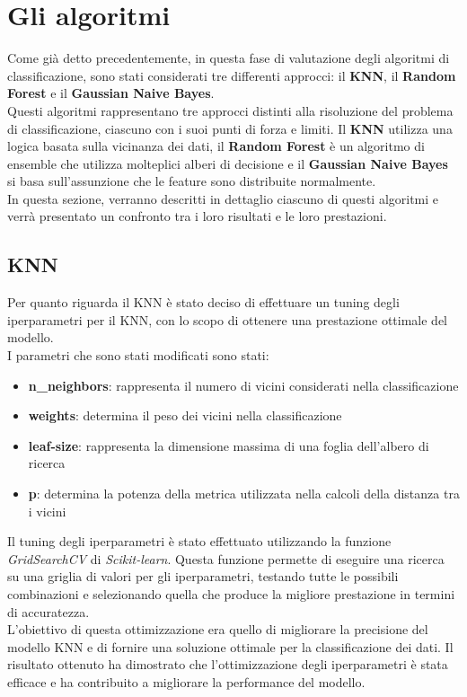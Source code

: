 \documentclass[../../Report.tex]{subfiles}
\begin{document}
\section{Gli algoritmi}
Come già detto precedentemente, in questa fase di valutazione degli algoritmi di classificazione, sono stati considerati tre differenti approcci: il \textbf{KNN}, il \textbf{Random Forest} e il \textbf{Gaussian Naive Bayes}.\\
Questi algoritmi rappresentano tre approcci distinti alla risoluzione del problema di classificazione, ciascuno con i suoi punti di forza e limiti. Il \textbf{KNN} utilizza una logica basata sulla vicinanza dei dati, il \textbf{Random Forest} è un algoritmo di ensemble che utilizza molteplici alberi di decisione e il \textbf{Gaussian Naive Bayes} si basa sull'assunzione che le feature sono distribuite normalmente.\\
In questa sezione, verranno descritti in dettaglio ciascuno di questi algoritmi e verrà presentato un confronto tra i loro risultati e le loro prestazioni.
\subsection{KNN}
Per quanto riguarda il KNN è stato deciso di effettuare un tuning degli iperparametri per il KNN, con lo scopo di ottenere una prestazione ottimale del modello.\\
I parametri che sono stati modificati sono stati:
\begin{itemize}
    \item \textbf{n\_neighbors}: rappresenta il numero di vicini considerati nella classificazione
    \item \textbf{weights}: determina il peso dei vicini nella classificazione
    \item \textbf{leaf-size}: rappresenta la dimensione massima di una foglia dell'albero di ricerca
    \item \textbf{p}: determina la potenza della metrica utilizzata nella calcoli della distanza tra i vicini
\end{itemize}
Il tuning degli iperparametri è stato effettuato utilizzando la funzione \emph{GridSearchCV} di \emph{Scikit-learn}. Questa funzione permette di eseguire una ricerca su una griglia di valori per gli iperparametri, testando tutte le possibili combinazioni e selezionando quella che produce la migliore prestazione in termini di accuratezza.\\
L'obiettivo di questa ottimizzazione era quello di migliorare la precisione del modello KNN e di fornire una soluzione ottimale per la classificazione dei dati. Il risultato ottenuto ha dimostrato che l'ottimizzazione degli iperparametri è stata efficace e ha contribuito a migliorare la performance del modello.
\end{document}
